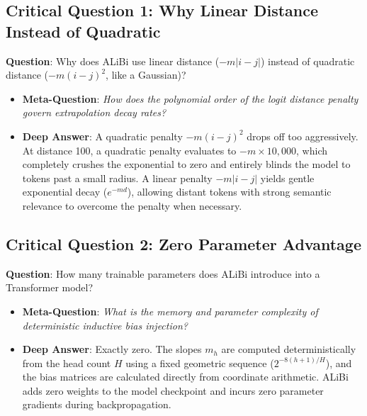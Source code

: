 \documentclass[11pt,a4paper]{article}
\theoremstyle{definition}
\begin{document}
\subsection{\textbf{Critical Question 1: Why Linear Distance Instead of Quadratic}}
\textbf{Question}: Why does ALiBi use linear distance ($-m |i - j|$) instead of quadratic distance ($-m (i - j)^2$, like a Gaussian)?
\begin{itemize}
    \item \textbf{Meta-Question}: \emph{How does the polynomial order of the logit distance penalty govern extrapolation decay rates?}
    \item \textbf{Deep Answer}: A quadratic penalty $-m (i - j)^2$ drops off too aggressively. At distance 100, a quadratic penalty evaluates to $-m \times 10,000$, which completely crushes the exponential to zero and entirely blinds the model to tokens past a small radius. A linear penalty $-m |i - j|$ yields gentle exponential decay ($e^{-m d}$), allowing distant tokens with strong semantic relevance to overcome the penalty when necessary.
\end{itemize}

\subsection{\textbf{Critical Question 2: Zero Parameter Advantage}}
\textbf{Question}: How many trainable parameters does ALiBi introduce into a Transformer model?
\begin{itemize}
    \item \textbf{Meta-Question}: \emph{What is the memory and parameter complexity of deterministic inductive bias injection?}
    \item \textbf{Deep Answer}: Exactly zero. The slopes $m_h$ are computed deterministically from the head count $H$ using a fixed geometric sequence ($2^{-8(h+1)/H}$), and the bias matrices are calculated directly from coordinate arithmetic. ALiBi adds zero weights to the model checkpoint and incurs zero parameter gradients during backpropagation.
\end{itemize}
\end{document}
